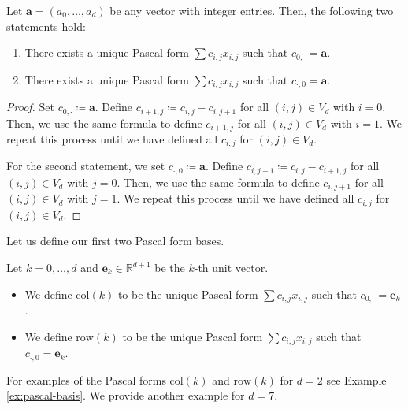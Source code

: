 \begin{proposition}\label{prop:supsup-pascal}
    Let \( \mathbf{a} = (a_0, \dots, a_d) \) be any vector with integer entries. Then, the following two statements hold:
    \begin{enumerate}
        \item There exists a unique Pascal form \( \sum c_{i,j}x_{i,j} \) such that \( c_{0,\cdot} = \mathbf a \).
        \item There exists a unique Pascal form \( \sum c_{i,j}x_{i,j} \) such that \( c_{\cdot,0} = \mathbf a \).
    \end{enumerate}
\end{proposition}

\begin{proof}
    Set \( c_{0,\cdot} \coloneqq \mathbf a \). Define \( c_{i+1,j} \coloneqq c_{i,j} - c_{i,j+1}\) for all \( (i,j) \in V_d \) with \( i=0 \). Then, we use the same formula to define \( c_{i+1,j} \) for all \( (i,j) \in V_d \) with \( i=1 \). We repeat this process until we have defined all \( c_{i,j} \) for \( (i,j) \in V_d \).

    For the second statement, we set \( c_{\cdot,0} \coloneqq \mathbf a \). Define \( c_{i,j+1} \coloneqq c_{i,j} - c_{i+1,j}\) for all \( (i,j) \in V_d \) with \( j=0 \). Then, we use the same formula to define \( c_{i,j+1} \) for all \( (i,j) \in V_d \) with \( j=1 \). We repeat this process until we have defined all \( c_{i,j} \) for \( (i,j) \in V_d \).
\end{proof}

Let us define our first two Pascal form bases.

\begin{definition}
    Let \( k = 0, \dots, d \) and \( \mathbf e_k \in \mathbb{R}^{d+1} \) be the \( k \)-th unit vector. 
    \begin{itemize}
        \item We define \( \mathrm{col}(k) \) to be the unique Pascal form \( \sum c_{i,j}x_{i,j} \) such that \( c_{0,\cdot} = \mathbf e_k \).
        \item We define \( \mathrm{row}(k) \) to be the unique Pascal form \( \sum c_{i,j}x_{i,j} \) such that \( c_{\cdot,0} = \mathbf e_k \).
    \end{itemize}
\end{definition}

For examples of the Pascal forms \( \mathrm{col}(k) \) and \( \mathrm{row}(k) \) for \( d = 2 \) see Example \ref{ex:pascal-basis}. We provide another example for \( d = 7 \).

